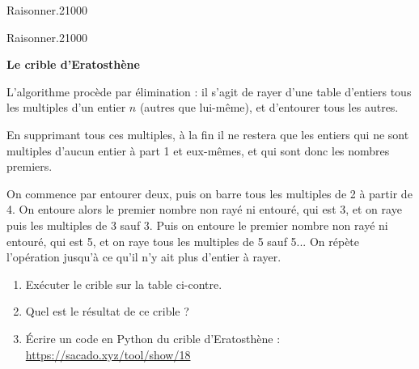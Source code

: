 \begin{pageParcourst}
\begin{ExoCtN}{Raisonner.}{2}{1}{0}{0}{0}
\end{ExoCtN}

\begin{ExoCtN}{Raisonner.}{2}{1}{0}{0}{0}
 
 \begin{minipage}{0.5\linewidth} 
 
\textbf{Le crible d'Eratosthène}

L'algorithme procède par élimination : il s'agit de rayer d'une table d'entiers tous les multiples d'un entier $n$ (autres que lui-même), et d'entourer
tous les autres. 

En supprimant tous ces multiples, à la fin il ne restera que les entiers qui ne sont multiples d'aucun entier à part 1 et eux-mêmes, et qui sont donc les nombres premiers.

On commence par entourer deux, puis on barre tous
les multiples de 2 à partir de 4. On entoure alors le premier
nombre non rayé ni entouré, qui est 3, et on raye puis les multiples de 3
sauf 3. Puis on entoure le premier nombre non rayé ni entouré, qui est
5, et on raye tous les multiples de 5 sauf 5... On répète l'opération
jusqu'à ce qu'il n'y ait plus d'entier à rayer. 

\begin{enumerate}

\item Exécuter le crible sur la table ci-contre.
\item Quel est le résultat de ce crible ? 

\item Écrire un code en Python du crible d'Eratosthène : \url{https://sacado.xyz/tool/show/18}

\end{enumerate}

\end{minipage}
\begin{minipage}{0.5\linewidth}

 



\end{minipage}
\end{ExoCtN}
\end{pageParcourst}

